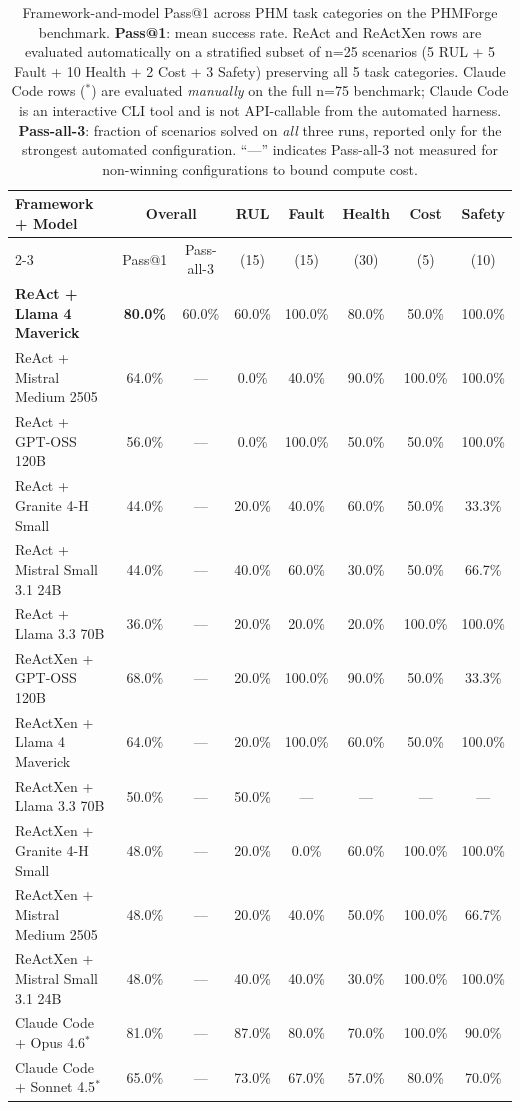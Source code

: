 \begin{table}[t]
\caption{Framework-and-model Pass@1 across PHM task categories on the PHMForge benchmark. \textbf{Pass@1}: mean success rate. ReAct and ReActXen rows are evaluated automatically on a stratified subset of n=25 scenarios (5 RUL + 5 Fault + 10 Health + 2 Cost + 3 Safety) preserving all 5 task categories. Claude Code rows ($^{*}$) are evaluated \emph{manually} on the full n=75 benchmark; Claude Code is an interactive CLI tool and is not API-callable from the automated harness. \textbf{Pass-all-3}: fraction of scenarios solved on \emph{all} three runs, reported only for the strongest automated configuration. ``---'' indicates Pass-all-3 not measured for non-winning configurations to bound compute cost.}
\label{tab:framework_performance}
\centering
\small
\setlength{\tabcolsep}{4pt}
\begin{tabular}{@{}lccccccc@{}}
\toprule
\textbf{Framework + Model} & \multicolumn{2}{c}{\textbf{Overall}} & \textbf{RUL} & \textbf{Fault} & \textbf{Health} & \textbf{Cost} & \textbf{Safety} \\
\cmidrule(lr){2-3}
& Pass@1 & Pass-all-3 & (15) & (15) & (30) & (5) & (10) \\
\midrule
\rowcolor{highlight}
\textbf{ReAct + Llama 4 Maverick} & \textbf{80.0\%} & 60.0\% & 60.0\% & 100.0\% & 80.0\% & 50.0\% & 100.0\% \\
ReAct + Mistral Medium 2505 & 64.0\% & --- & 0.0\% & 40.0\% & 90.0\% & 100.0\% & 100.0\% \\
ReAct + GPT-OSS 120B & 56.0\% & --- & 0.0\% & 100.0\% & 50.0\% & 50.0\% & 100.0\% \\
ReAct + Granite 4-H Small & 44.0\% & --- & 20.0\% & 40.0\% & 60.0\% & 50.0\% & 33.3\% \\
ReAct + Mistral Small 3.1 24B & 44.0\% & --- & 40.0\% & 60.0\% & 30.0\% & 50.0\% & 66.7\% \\
ReAct + Llama 3.3 70B & 36.0\% & --- & 20.0\% & 20.0\% & 20.0\% & 100.0\% & 100.0\% \\
\midrule
ReActXen + GPT-OSS 120B & 68.0\% & --- & 20.0\% & 100.0\% & 90.0\% & 50.0\% & 33.3\% \\
ReActXen + Llama 4 Maverick & 64.0\% & --- & 20.0\% & 100.0\% & 60.0\% & 50.0\% & 100.0\% \\
ReActXen + Llama 3.3 70B & 50.0\% & --- & 50.0\% & --- & --- & --- & --- \\
ReActXen + Granite 4-H Small & 48.0\% & --- & 20.0\% & 0.0\% & 60.0\% & 100.0\% & 100.0\% \\
ReActXen + Mistral Medium 2505 & 48.0\% & --- & 20.0\% & 40.0\% & 50.0\% & 100.0\% & 66.7\% \\
ReActXen + Mistral Small 3.1 24B & 48.0\% & --- & 40.0\% & 40.0\% & 30.0\% & 100.0\% & 100.0\% \\
\midrule
Claude Code + Opus 4.6$^{*}$ & 81.0\% & --- & 87.0\% & 80.0\% & 70.0\% & 100.0\% & 90.0\% \\
Claude Code + Sonnet 4.5$^{*}$ & 65.0\% & --- & 73.0\% & 67.0\% & 57.0\% & 80.0\% & 70.0\% \\
\bottomrule
\end{tabular}
\end{table}